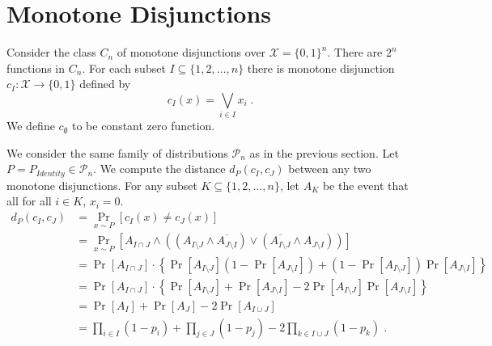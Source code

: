\documentclass[10pt]{article}
\renewcommand{\P}{\mathcal{P}}
\newcommand{\X}{\mathcal{X}}
\begin{document}
\section{Monotone Disjunctions}

Consider the class $C_n$ of monotone disjunctions over $\X = \{0,1\}^n$. There
are $2^n$ functions in $C_n$. For each subset $I \subseteq \{1,2,\dots,n\}$
there is monotone disjunction $c_I:\X \to \{0,1\}$ defined by
$$
c_I(x) = \bigvee_{i \in I} x_i \; .
$$
We define $c_\emptyset$ to be constant zero function.

We consider the same family of distributions $\P_n$ as in the previous section.
Let $P = P_{Identity} \in \P_n$. We compute the distance $d_P(c_I, c_J)$ between
any two monotone disjunctions. For any subset $K \subseteq \{1,2,\dots,n\}$, let
$A_K$ be the event that all for all $i \in K$, $x_i = 0$.
\begin{align*}
d_P(c_I, c_J)
& = \Pr_{x \sim P}[c_I(x) \neq c_J(x)] \\
& = \Pr_{x \sim P}[A_{I \cap J} \wedge ((A_{I \setminus J} \wedge \overline{A_{J \setminus I}}) \vee (\overline{A_{I \setminus J}} \wedge A_{J \setminus I} )) ] \\
& = \Pr[A_{I \cap J}] \cdot \left\{ \Pr[A_{I \setminus J}] (1 - \Pr[A_{J \setminus I}]) + (1 - \Pr[A_{I \setminus J}]) \Pr[A_{J \setminus I}] \right\} \\
& = \Pr[A_{I \cap J}] \cdot \left\{ \Pr[A_{I \setminus J}] + \Pr[A_{J \setminus I}] - 2 \Pr[A_{I \setminus J}] \Pr[A_{J \setminus I}] \right\} \\
& = \Pr[A_I] + \Pr[A_J] - 2 \Pr[A_{I \cup J}] \\
& = \prod_{i \in I} (1 - p_i) + \prod_{j \in J} (1 - p_j) - 2 \prod_{k \in I \cup J} (1 - p_k) \; . \\
\end{align*}



\end{document}
